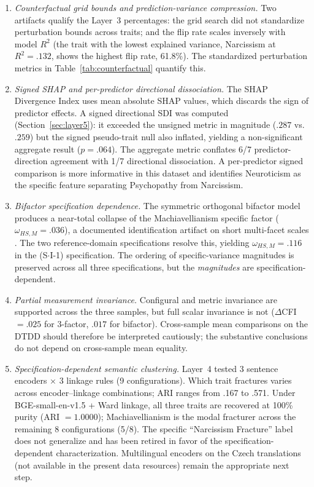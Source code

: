 \documentclass[11pt,twocolumn]{article}
\begin{document}
\begin{enumerate}[leftmargin=1.2em,itemsep=0pt,topsep=2pt]
\item \textit{Counterfactual grid bounds and prediction-variance compression.} Two artifacts qualify the Layer~3 percentages: the grid search did not standardize perturbation bounds across traits; and the flip rate scales inversely with model $R^2$ (the trait with the lowest explained variance, Narcissism at $R^2 = .132$, shows the highest flip rate, 61.8\%). The standardized perturbation metrics in Table~\ref{tab:counterfactual} quantify this.
\item \textit{Signed SHAP and per-predictor directional dissociation.} The SHAP Divergence Index uses mean absolute SHAP values, which discards the sign of predictor effects. A signed directional SDI was computed (Section~\ref{sec:layer5}): it exceeded the unsigned metric in magnitude ($.287$ vs.\ $.259$) but the signed pseudo-trait null also inflated, yielding a non-significant aggregate result ($p = .064$). The aggregate metric conflates 6/7 predictor-direction agreement with 1/7 directional dissociation. A per-predictor signed comparison is more informative in this dataset and identifies Neuroticism as the specific feature separating Psychopathy from Narcissism.
\item \textit{Bifactor specification dependence.} The symmetric orthogonal bifactor model produces a near-total collapse of the Machiavellianism specific factor ($\omega_{HS,M} = .036$), a documented identification artifact on short multi-facet scales \citep{knitter2025, eid2017}. The two reference-domain specifications resolve this, yielding $\omega_{HS,M} = .116$ in the (S$\cdot$I-1) specification. The ordering of specific-variance magnitudes is preserved across all three specifications, but the \textit{magnitudes} are specification-dependent.
\item \textit{Partial measurement invariance.} Configural and metric invariance are supported across the three samples, but full scalar invariance is not ($\Delta$CFI $= .025$ for 3-factor, $.017$ for bifactor). Cross-sample mean comparisons on the DTDD should therefore be interpreted cautiously; the substantive conclusions do not depend on cross-sample mean equality.
\item \textit{Specification-dependent semantic clustering.} Layer~4 tested 3 sentence encoders $\times$ 3 linkage rules (9 configurations). Which trait fractures varies across encoder--linkage combinations; ARI ranges from .167 to .571. Under BGE-small-en-v1.5 + Ward linkage, all three traits are recovered at 100\% purity (ARI $= 1.0000$); Machiavellianism is the modal fracturer across the remaining 8 configurations (5/8). The specific ``Narcissism Fracture'' label does not generalize and has been retired in favor of the specification-dependent characterization. Multilingual encoders on the Czech translations (not available in the present data resources) remain the appropriate next step.

\end{enumerate}
\end{document}
